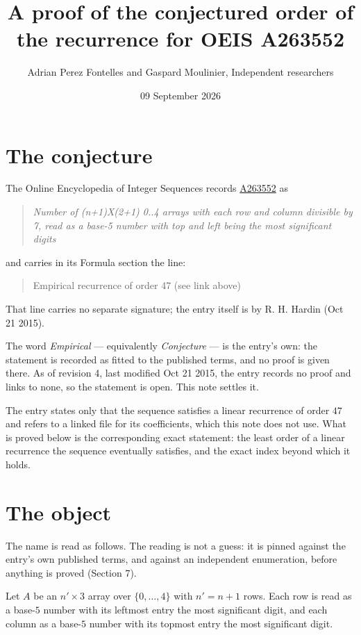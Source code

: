 \documentclass[11pt]{article}
\title{A proof of the conjectured order of the recurrence for OEIS A263552}
\author{Adrian Perez Fontelles and Gaspard Moulinier, Independent researchers}
\date{09 September 2026}
\theoremstyle{definition}
\begin{document}
\maketitle
\section{The conjecture}

The Online Encyclopedia of Integer Sequences records \href{https://oeis.org/A263552}{A263552} as

\begin{quote}\itshape Number of (n+1)X(2+1) 0..4 arrays with each row and column divisible by 7, read as a base-5 number with top and left being the most significant digits\end{quote}

and carries in its Formula section the line:

\begin{quote}\ttfamily Empirical recurrence of order 47 (see link above)\end{quote}

That line carries no separate signature; the entry itself is by R. H. Hardin (Oct 21 2015).

The word {\itshape Empirical} --- equivalently {\itshape Conjecture} --- is the entry's own: the statement is recorded as fitted to the published terms, and no proof is given there. As of revision 4, last modified Oct 21 2015, the entry records no proof and links to none, so the statement is open. This note settles it.

The entry states only that the sequence satisfies a linear recurrence of order $47$ and refers to a linked file for its coefficients, which this note does not use. What is proved below is the corresponding exact statement: the least order of a linear recurrence the sequence eventually satisfies, and the exact index beyond which it holds.

\section{The object}

The name is read as follows. The reading is not a guess: it is pinned against the entry's own published terms, and against an independent enumeration, before anything is proved (Section 7).

Let $A$ be an $n' \times 3$ array over $\{0,\dots,4\}$ with $n' = n + 1$ rows. Each row is read as a base-$5$ number with its leftmost entry the most significant digit, and each column as a base-$5$ number with its topmost entry the most significant digit.
\end{document}
